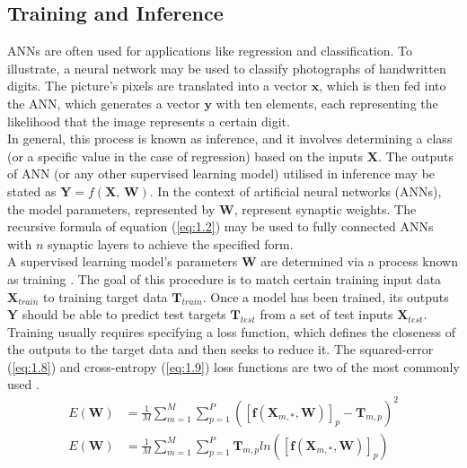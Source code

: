 \subsection[Training and Inference]{Training and Inference}

ANNs are often used for applications like regression and classification. To illustrate, a neural network may be used to classify photographs of handwritten digits. The picture's pixels are translated into a vector $\textbf{x}$, which is then fed into the ANN, which generates a vector $\textbf{y}$ with ten elements, each representing the likelihood that the image represents a certain digit. \\

\noindent In general, this process is known as inference, and it involves determining a class (or a specific value in the case of regression) based on the inputs $\textbf{X}$. The outputs of ANN (or any other supervised learning model) utilised in inference may be stated as $\textbf{Y} = f(\textbf{X, W})$. In the context of artificial neural networks (ANNs), the model parameters, represented by $\textbf{W}$, represent synaptic weights. The recursive formula of equation (\ref{eq:1.2}) may be used to fully connected ANNs with $n$ synaptic layers to achieve the specified form. \\

\noindent A supervised learning model's parameters $\textbf{W}$ are determined via a process known as training \cite{bishop2006pattern}. The goal of this procedure is to match certain training input data $\textbf{X}_{train} $ to training target data $\textbf{T}_{train}$. Once a model has been trained, its outputs $\textbf{Y}$ should be able to predict test targets $\textbf{T}_{test}$ from a set of test inputs $\textbf{X}_{test}$. Training usually requires specifying a loss function, which defines the closeness of the outputs to the target data and then seeks to reduce it. The squared-error (\ref{eq:1.8}) and cross-entropy (\ref{eq:1.9}) loss functions are two of the most commonly used \cite{kline2005revisiting}. 
\begin{align}
    E\left ( \mathbf{W} \right ) &= \frac{1}{M} \sum_{m=1}^{M} \sum_{p=1}^{P} \left ( \left [ \mathbf{f} \left ( \mathbf{X}_{m,*}, \mathbf{W} \right ) \right ]_{p} - \mathbf{T}_{m,p} \right )^{2} \label{eq:1.8} \\
    E\left ( \mathbf{W} \right ) &= \frac{1}{M} \sum_{m=1}^{M} \sum_{p=1}^{P}  \mathbf{T}_{m,p} ln \left ( \left [ \mathbf{f} \left ( \mathbf{X}_{m,*}, \mathbf{W} \right ) \right ]_{p}\right ) \label{eq:1.9}
\end{align}

